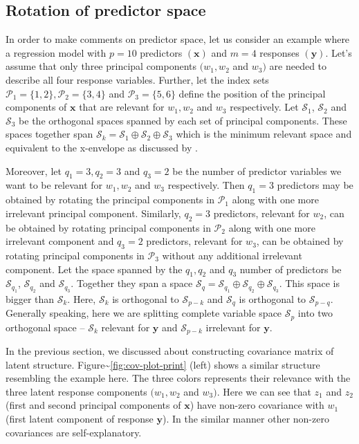\documentclass[12pt,A4paper,authoryear]{elsarticle} %
\theoremstyle{definition}
\theoremstyle{definition}
\theoremstyle{remark}
\begin{document}
\subsection{Rotation of predictor
space}\label{rotation-of-predictor-space}

In order to make comments on predictor space, let us consider an example
where a regression model with \(p = 10\) predictors \((\mathbf{x})\) and
\(m = 4\) responses \((\mathbf{y})\). Let's assume that only three
principal components \((w_1, w_2\) and \(w_3)\) are needed to describe
all four response variables. Further, let the index sets
\(\mathcal{P}_1 = \{1, 2\}, \mathcal{P}_2 = \{3, 4\}\) and
\(\mathcal{P}_3 = \{5, 6\}\) define the position of the principal
components of \(\mathbf{x}\) that are relevant for \(w_1, w_2\) and
\(w_3\) respectively. Let \(\mathcal{S}_1\), \(\mathcal{S}_2\) and
\(\mathcal{S}_3\) be the orthogonal spaces spanned by each set of
principal components. These spaces together span
\(\mathcal{S}_k = \mathcal{S}_1 \oplus \mathcal{S}_2 \oplus \mathcal{S}_3\)
which is the minimum relevant space and equivalent to the x-envelope as
discussed by \citet{cook2013envelopes}.

Moreover, let \(q_1 = 3, q_2 = 3\) and \(q_3 = 2\) be the number of
predictor variables we want to be relevant for \(w_1, w_2\) and \(w_3\)
respectively. Then \(q_1 = 3\) predictors may be obtained by rotating
the principal components in \(\mathcal{P}_1\) along with one more
irrelevant principal component. Similarly, \(q_2 = 3\) predictors,
relevant for \(w_2\), can be obtained by rotating principal components
in \(\mathcal{P}_2\) along with one more irrelevant component and
\(q_3 = 2\) predictors, relevant for \(w_3\), can be obtained by
rotating principal components in \(\mathcal{P}_3\) without any
additional irrelevant component. Let the space spanned by the
\(q_1, q_2\) and \(q_3\) number of predictors be \(\mathcal{S}_{q_1}\),
\(\mathcal{S}_{q_2}\) and \(\mathcal{S}_{q_3}\). Together they span a
space
\(\mathcal{S}_q = \mathcal{S}_{q_1} \oplus \mathcal{S}_{q_2} \oplus \mathcal{S}_{q_3}\).
This space is bigger than \(\mathcal{S}_k\). Here, \(\mathcal{S}_k\) is
orthogonal to \(\mathcal{S}_{p - k}\) and \(\mathcal{S}_q\) is
orthogonal to \(\mathcal{S}_{p - q}\). Generally speaking, here we are
splitting complete variable space \(\mathcal{S}_p\) into two orthogonal
space -- \(\mathcal{S}_k\) relevant for \(\mathbf{y}\) and
\(\mathcal{S}_{p - k}\) irrelevant for \(\mathbf{y}\).

In the previous section, we discussed about constructing covariance
matrix of latent structure.
Figure\textasciitilde{}\ref{fig:cov-plot-print} (left) shows a similar
structure resembling the example here. The three colors represents their
relevance with the three latent response components \((w_1, w_2\) and
\(w_3)\). Here we can see that \(z_{1}\) and \(z_{2}\) (first and second
principal components of \(\mathbf{x}\)) have non-zero covariance with
\(w_1\) (first latent component of response \(\mathbf{y}\)). In the
similar manner other non-zero covariances are self-explanatory.
\end{document}
